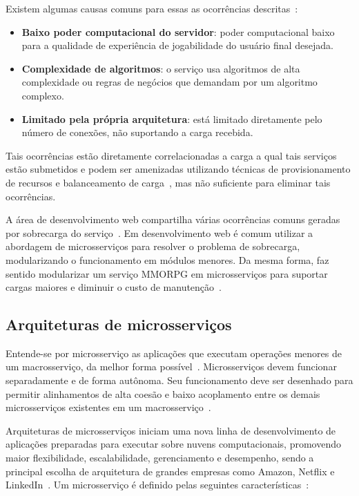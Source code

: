 Existem algumas causas comuns para essas as ocorrências descritas~\cite{1417630}:

\begin{itemize}
  \item \textbf{Baixo poder computacional do servidor}: poder computacional baixo para a qualidade de experiência de jogabilidade do usuário final desejada.
  \item \textbf{Complexidade de algoritmos}: o serviço usa algoritmos de alta complexidade ou regras de negócios que demandam por um algoritmo complexo.
  \item \textbf{Limitado pela própria arquitetura}: está limitado diretamente pelo número de conexões, não suportando a carga recebida.
\end{itemize}

Tais ocorrências estão diretamente correlacionadas a carga a qual tais serviços estão submetidos e podem ser amenizadas utilizando técnicas de provisionamento de recursos e balanceamento de carga~\cite{1417630}, mas não suficiente para eliminar tais ocorrências.

A área de desenvolvimento web compartilha várias ocorrências comuns geradas por sobrecarga do serviço~\cite{7830692}.
%
Em desenvolvimento web é comum utilizar a abordagem de microsserviços para resolver o problema de sobrecarga, modularizando o  funcionamento em módulos menores.
%
Da mesma forma, faz sentido modularizar um serviço \ac{MMORPG} em microsserviços para suportar cargas maiores e diminuir o custo de manutenção~\cite{7515686}.

\subsection{Arquiteturas de microsserviços}

Entende-se por microsserviço as aplicações que executam operações menores de um macrosserviço, da melhor forma possível~\cite{stephenclarkewillson2017}.
%
Microsserviços devem funcionar separadamente e de forma autônoma.
%
Seu funcionamento deve ser desenhado para permitir alinhamentos de alta coesão e baixo acoplamento entre os demais microsserviços existentes em um macrosserviço~\cite{8169955}.



Arquiteturas de microsserviços iniciam uma nova linha de desenvolvimento de aplicações preparadas para executar sobre nuvens computacionais, promovendo maior flexibilidade, escalabilidade, gerenciamento e desempenho, sendo a principal escolha de arquitetura de grandes empresas como Amazon, Netflix e LinkedIn~\cite{7830692,7515686}.
%
Um microsserviço é definido pelas seguintes características~\cite{8169955}:

